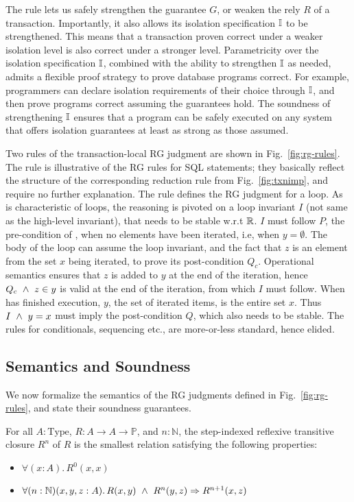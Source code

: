 The  rule lets us safely strengthen the guarantee
$G$, or weaken the rely $R$ of a transaction. Importantly, it also
allows its isolation specification $\mathbb{I}$ to be strengthened. This means
that a transaction proven correct under a weaker isolation level is
also correct under a stronger level. Parametricity over the isolation
specification $\mathbb{I}$, combined with the ability to strengthen $\mathbb{I}$ as
needed, admits a flexible proof strategy to prove database programs
correct. For example, programmers can declare isolation requirements
of their choice through $\mathbb{I}$, and then prove programs correct assuming
the guarantees hold. The soundness of strengthening $\mathbb{I}$ ensures that
a program can be safely executed on any system that offers isolation
guarantees at least as strong as those assumed.

Two rules of the transaction-local RG judgment are shown in
Fig.~\ref{fig:rg-rules}. The rule  is
illustrative of the RG rules for SQL statements; they basically
reflect the structure of the corresponding reduction rule from
Fig.~\ref{fig:txnimp}, and require no further explanation. The rule
 defines the RG judgment for a  loop.
As is characteristic of loops, the reasoning is pivoted on a loop
invariant $I$ (not same as the high-level invariant), that needs to
be stable w.r.t $\mathbb{R}$. $I$ must follow $P$, the pre-condition of
, when no elements have been iterated, i.e, when
$y=\emptyset$. The body of the loop can assume the loop invariant, and
the fact that $z$ is an element from the set $x$ being iterated, to
prove its post-condition $Q_c$. Operational semantics ensures that $z$
is added to $y$ at the end of the iteration, hence $Q_c ~\wedge~ z\in y$
is valid at the end of the iteration, from which $I$ must follow. When
 has finished execution, $y$, the set of iterated items, is
the entire set $x$. Thus $I ~\wedge~ y=x$ must imply the post-condition
$Q$, which also needs to be stable. The rules for conditionals,
sequencing etc., are more-or-less standard, hence elided.

\subsection{Semantics and Soundness}

We now formalize the semantics of the RG judgments defined in
Fig.~\ref{fig:rg-rules}, and state their soundness guarantees.

\begin{definition}
For all $A:\text{Type}$, $R: A \rightarrow A \rightarrow \mathbb{P}$, and $n :
\mathbb{N}$, the step-indexed reflexive transitive closure $R^n$ of $R$ is
the smallest relation satisfying the following
properties:
\begin{itemize}
\item $\forall (x:A).\, R^0 (x,x)$
\item $\forall (n:\mathbb{N})(x,y,z : A).\, R(x,y) ~\wedge~ R^n(y,z) \Rightarrow
R^{n+1}(x,z)$
\end{itemize}
\end{definition}

